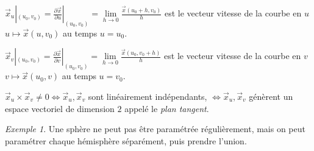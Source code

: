 \documentclass{report}
\theoremstyle{definition}
\theoremstyle{remark}
\newtheorem*{exem}{Exemple}
\begin{document}
	$\vec x_u|_{(u_0,v_0)} = \frac{\partial\vec x}{\partial u}|_{(u_0,v_0)} = \lim\limits_{h\to0}\frac{\vec x(u_0+h,v_0)}{h}$ est le vecteur vitesse de la courbe en $u$ $u \mapsto \vec x(u,v_0)$ au temps $u=u_0$.

	$\vec x_v|_{(u_0,v_0)} = \frac{\partial\vec x}{\partial v}|_{(u_0,v_0)} = \lim\limits_{h\to0}\frac{\vec x(u_0,v_0+h)}{h}$ est le vecteur vitesse de la courbe en $v$ $v \mapsto \vec x(u_0,v)$ au temps $u=v_0$.

	$\vec x_u \times \vec x_v \neq 0 \Longleftrightarrow \vec x_u,\vec x_v$ sont lin\'eairement ind\'ependants, $\Longleftrightarrow \vec x_u,\vec x_v$ g\'en\`erent un espace vectoriel de dimension $2$ appel\'e le \emph{plan tangent}.

	\begin{exem}
		Une sph\`ere ne peut pas \^etre param\'etr\'ee r\'eguli\`erement, mais on peut param\'etrer chaque h\'emisph\`ere s\'epar\'ement, puis prendre l'union.
	\end{exem}
\end{document}
